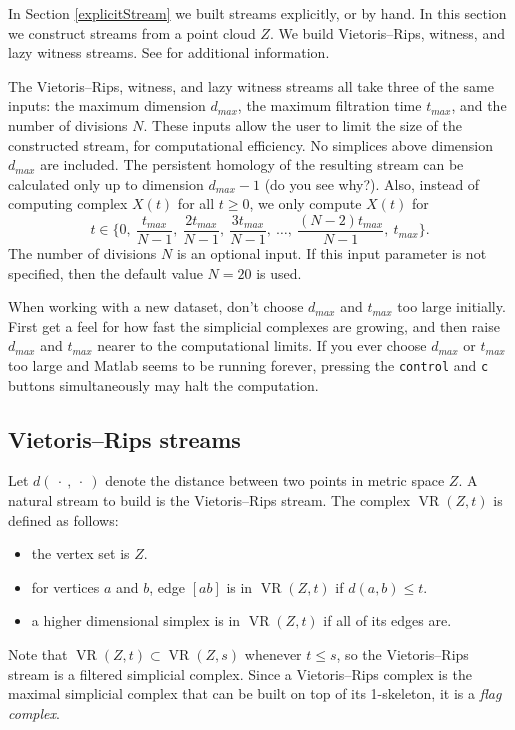 \documentclass[amscd, amssymb, verbatim]{amsart}[12pt]
\theoremstyle{remark}
\theoremstyle{remark}
\theoremstyle{remark}
\DeclareMathOperator{\VR}{VR}
\begin{document}
In Section \ref{explicitStream} we built streams explicitly, or by hand. In this section we construct streams from a point cloud $Z$. We build Vietoris--Rips, witness, and lazy witness streams. See \citet{WitnessComplexes} for additional information. 

The Vietoris--Rips, witness, and lazy witness streams all take three of the same inputs: the maximum dimension $d_{max}$, the maximum filtration time $t_{max}$, and the number of divisions $N$. These inputs allow the user to limit the size of the constructed stream, for computational efficiency. No simplices above dimension $d_{max}$ are included. The persistent homology of the resulting stream can be calculated only up to dimension $d_{max} - 1$ (do you see why?). Also, instead of computing complex $X(t)$ for all $t \geq 0$, we only compute $X(t)$ for
$$t \in \Biggl\{ 0,\ \frac{t_{max}}{N-1},\ \frac{2t_{max}}{N-1},\ \frac{3t_{max}}{N-1},\ \dots,\ \frac{(N-2)t_{max}}{N-1},\ t_{max} \Biggr\}.$$
The number of divisions $N$ is an optional input. If this input parameter is not specified, then the default value $N = 20$ is used. 

When working with a new dataset, don't choose $d_{max}$ and $t_{max}$ too large initially. First get a feel for how fast the simplicial complexes are growing, and then raise $d_{max}$ and $t_{max}$ nearer to the computational limits. If you ever choose $d_{max}$ or $t_{max}$ too large and Matlab seems to be running forever, pressing the \texttt{control} and \texttt{c} buttons simultaneously may halt the computation. 



\subsection{Vietoris--Rips streams}\label{Vietoris--Rips}
Let  $d(\ \cdot\ ,\ \cdot \ )$ denote the distance between two points in metric space $Z$. A natural stream to build is the Vietoris--Rips stream. The complex $\VR(Z,t)$ is defined as follows: 
\begin{itemize}
\item{the vertex set is $Z$.}
\item{for vertices $a$ and $b$, edge $[ab]$ is in $\VR(Z,t)$ if $d(a,b) \leq t$.}
\item{a higher dimensional simplex is in $\VR(Z,t)$ if all of its edges are.}
\end{itemize}
Note that $\VR(Z,t) \subset \VR(Z,s)$ whenever $t\leq s$, so the Vietoris--Rips stream is a filtered simplicial complex. Since a Vietoris--Rips complex is the maximal simplicial complex that can be built on top of its 1-skeleton, it is a {\em flag complex}. 
\end{document}
